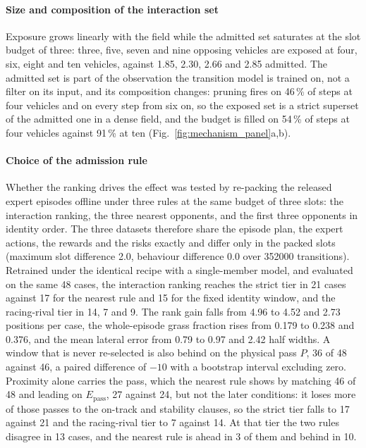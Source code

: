 \documentclass[journal]{IEEEtran}
\begin{document}
\paragraph{Size and composition of the interaction set}
Exposure grows linearly with the field while the admitted set saturates at the
slot budget of three: three, five, seven and nine opposing vehicles are exposed
at four, six, eight and ten vehicles, against 1.85, 2.30, 2.66 and 2.85
admitted. The admitted set is part of the observation the transition model is
trained on, not a filter on its input, and its composition changes: pruning
fires on 46\,\% of steps at four vehicles and on every step from six on, so the
exposed set is a strict superset of the admitted one in a dense field, and the
budget is filled on 54\,\% of steps at four vehicles against 91\,\% at ten
(Fig.~\ref{fig:mechanism_panel}a,b).

\paragraph{Choice of the admission rule}
\label{sec:selector_control}
Whether the ranking drives the effect was tested by re-packing the released
expert episodes offline under three rules at the same budget of three slots: the
interaction ranking, the three nearest opponents, and the first three opponents
in identity order. The three datasets therefore share the episode plan, the
expert actions, the rewards and the risks exactly and differ only in the packed
slots (maximum slot difference 2.0, behaviour difference 0.0 over 352000
transitions). Retrained under the identical recipe with a single-member model,
and evaluated on the same 48 cases, the interaction ranking reaches the strict
tier in 21 cases against 17
for the nearest rule and 15 for the fixed identity window, and the racing-rival
tier in 14, 7 and 9. The rank gain falls from 4.96 to 4.52 and 2.73 positions
per case, the whole-episode grass fraction rises from 0.179 to 0.238 and 0.376,
and the mean lateral error from 0.79 to 0.97 and 2.42 half widths. A window that
is never re-selected is also behind on the physical pass $P$, 36 of 48 against
46, a paired difference of $-10$ with a bootstrap interval excluding zero.
Proximity alone carries the pass, which the nearest rule shows by matching 46 of
48 and leading on $E_{\mathrm{pass}}$, 27 against 24, but not the later
conditions: it loses more of those passes to the on-track and stability clauses,
so the strict tier falls to 17 against 21 and the racing-rival tier to 7 against
14. At that tier the two rules disagree in 13 cases, and the nearest rule is
ahead in 3 of them and behind in 10.
\end{document}
